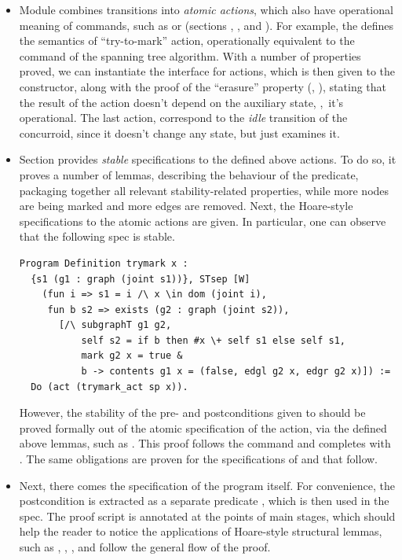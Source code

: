 \begin{itemize}
\item Module  combines transitions into \emph{atomic
    actions}, which also have operational meaning of commands, such as
   or  (sections ,
  , and ). For example, the
   defines the semantics of ``try-to-mark'' action,
  operationally equivalent to the  command of the spanning
  tree algorithm. With a number of properties proved, we can
  instantiate the  interface for actions, which is then
  given to the  constructor, along with the proof of
  the ``erasure'' property (\eg, ), stating
  that the result of the action doesn't depend on the auxiliary state,
  \ie,~it's operational. The last action, 
  correspond to the \emph{idle} transition of the concurroid, since it
  doesn't change any state, but just examines it.

\item Section  provides \emph{stable}
  specifications to the defined above actions. To do so, it proves a
  number of lemmas, describing the behaviour of the 
  predicate, packaging together all relevant stability-related
  properties, while more nodes are being marked and more edges are
  removed. Next, the Hoare-style specifications to the atomic actions
  are given. In particular, one can observe that the following spec is stable.

\begin{lstlisting}
Program Definition trymark x :
  {s1 (g1 : graph (joint s1))}, STsep [W] 
    (fun i => s1 = i /\ x \in dom (joint i),
     fun b s2 => exists (g2 : graph (joint s2)),
       [/\ subgraphT g1 g2, 
           self s2 = if b then #x \+ self s1 else self s1,
           mark g2 x = true &
           b -> contents g1 x = (false, edgl g2 x, edgr g2 x)]) :=
  Do (act (trymark_act sp x)).    
\end{lstlisting}

However, the stability of the pre- and postconditions given to
 should be proved formally out of the atomic
specification of the  action, via the defined above
lemmas, such as . This proof follows the  command and completes with .
%
The same obligations are proven for the specifications of
 and  that follow.

\item Next, there comes the specification of the program 
  itself. For convenience, the postcondition is extracted as a
  separate predicate , which is then used in the
  spec. The proof script is annotated at the points of main stages,
  which should help the reader to notice the applications of
  Hoare-style structural lemmas, such as , ,
   \etc, and follow the general flow of the proof.


\end{itemize}
